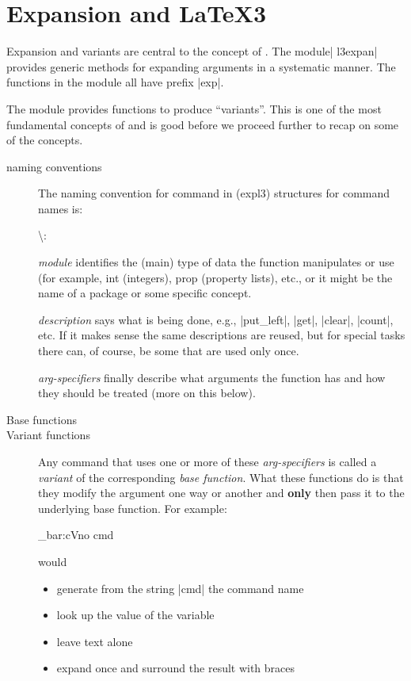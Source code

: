 \chapter{Expansion and LaTeX3}

Expansion and variants are central to the concept of . The module| l3expan| provides generic methods for expanding \tex arguments in a systematic manner. The functions in the module all have prefix |exp|.

The module provides functions to produce \enquote{variants}. This is one of the most fundamental concepts of  and is good before we proceed further to recap on some of the  concepts.

\begin{description}
\item [naming conventions] The naming convention for command in  (expl3)  structures for command names is:

\textbackslash {}\textunderscore {}: 

\textit{module} identifies the (main) type of data the function manipulates or use (for example, int (integers), prop (property lists), etc., or it might be the name of a package or some specific concept. 

\textit{description} says what is being done, e.g., |put_left|, |get|, |clear|, |count|, etc. If it makes sense the same descriptions are reused, but for special tasks there can, of course, be some that are used only once.

\textit{arg-specifiers} finally describe what arguments the function has and how they should be treated (more on this below).


\item[Base functions] \lorem 

\item[Variant functions]  Any command that uses one or more of these \emph{arg-specifiers} is called a \emph{variant} of the corresponding \emph{base function}. What these functions do is that they modify the argument one way or another and \textbf{only} then pass it to the underlying base function. For example:

\begin{teXXX}
\foo_bar:cVno {cmd}  \CMD
\end{teXXX}

would

\begin{itemize}
\item generate from the string |cmd| the command name 
\item look up the value of the variable 
\item leave text alone
\item expand  once and surround the result with braces
\end{itemize}


\end{description}

